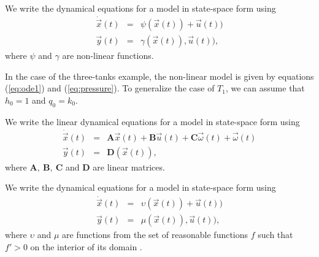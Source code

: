 \begin{definition}
We write the dynamical equations for a model in state-space form using
\begin{eqnarray}\label{dyn-model}
\dot{\vec{x}}(t) & = & \psi (\vec{x}(t)) + \vec{u}(t))\\
\vec{y}(t) & = & \gamma (\vec{x}(t)), \vec{u}(t)),
\end{eqnarray}
where $\psi$ and $\gamma$ are non-linear functions.
\end{definition}
%
In the case of the three-tanks example, the non-linear model is given
by equations (\ref{eq:ode1}) and (\ref{eq:pressure}). To generalize
the case of $T_1$, we can assume that $h_0 = 1$ and $q_0 = k_0$.
%
\begin{definition}
We write the linear dynamical equations for a model in state-space form using
\begin{eqnarray}\label{linear-model}
\dot{\vec{x}}(t) & = & \mathbf{A} \vec{x}(t) + \mathbf{B} \vec{u}(t) + \mathbf{C} \vec{\omega}(t) +  \vec{\omega}(t)\\
\vec{y}(t) & = & \mathbf{D} (\vec{x}(t)),
\end{eqnarray}
where $\mathbf{A}, ~ \mathbf{B},~\mathbf{C}$ and $\mathbf{D}$ are linear matrices.
\end{definition}

\begin{definition}
We write the dynamical equations for a model in state-space form using
\begin{eqnarray}\label{qual-model}
\dot{\vec{x}}(t) & = & \upsilon (\vec{x}(t)) + \vec{u}(t))\\
\vec{y}(t) & = & \mu (\vec{x}(t)), \vec{u}(t)),
\end{eqnarray}
where $\upsilon$ and $\mu$ are functions from the set of reasonable
functions $f$ such that $f' > 0$ on the interior of its domain
\citep{kuipers1994composition}.
\end{definition}


